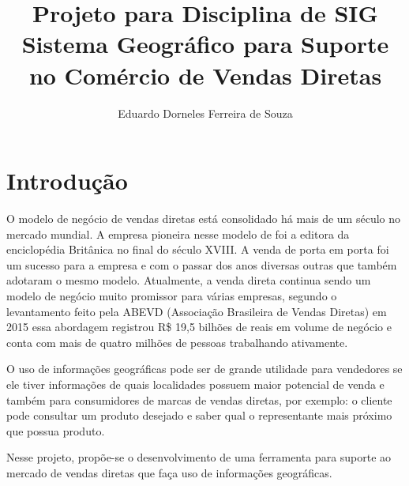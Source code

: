 \documentclass[oneside]{article}
\begin{document}
\title{Projeto para Disciplina de SIG \\
        \large Sistema Geográfico para Suporte no Comércio de Vendas Diretas}
\author{Eduardo Dorneles Ferreira de Souza}
\maketitle

\pagestyle{plain}

\section{Introdução}

O modelo de negócio de vendas diretas está consolidado há mais de um século no
mercado mundial. A empresa pioneira nesse modelo de foi a editora da enciclopédia
Britânica no final do século XVIII. A venda de porta em porta foi um sucesso
para a empresa e com o passar dos anos diversas outras que também adotaram
o mesmo modelo. Atualmente, a venda direta continua sendo um modelo de negócio
muito promissor para várias empresas, segundo o levantamento feito pela ABEVD
(Associação Brasileira de Vendas Diretas) em 2015 essa abordagem registrou
R\$ 19,5 bilhões de reais em volume de negócio e conta com mais de quatro milhões
de pessoas trabalhando ativamente.

O uso de informações geográficas pode ser de grande utilidade para vendedores
se ele tiver informações de quais localidades possuem maior potencial de venda
e também para consumidores de marcas de vendas diretas, por exemplo: o cliente
pode consultar um produto desejado e saber qual o representante mais próximo
que possua produto.

Nesse projeto, propõe-se o desenvolvimento de uma ferramenta para suporte ao
mercado de vendas diretas que faça uso de informações geográficas.
\end{document}
